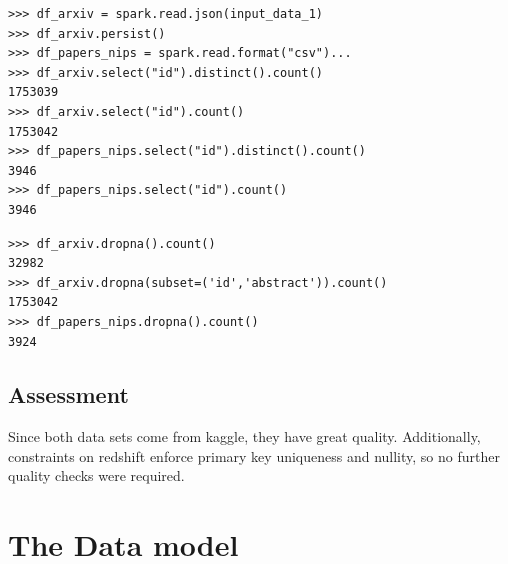 \begin{mdframed}[backgroundcolor=light-gray, roundcorner=10pt,leftmargin=1, rightmargin=1, innerleftmargin=15, innertopmargin=15,innerbottommargin=15, outerlinewidth=1, linecolor=light-gray]
\begin{lstlisting}[caption={Volume and Uniqueness},label={vol}]  
>>> df_arxiv = spark.read.json(input_data_1)
>>> df_arxiv.persist()
>>> df_papers_nips = spark.read.format("csv")...
>>> df_arxiv.select("id").distinct().count()
1753039                                                                         
>>> df_arxiv.select("id").count()
1753042                                                                         
>>> df_papers_nips.select("id").distinct().count()
3946
>>> df_papers_nips.select("id").count()
3946
\end{lstlisting}
\end{mdframed} 

\begin{mdframed}[backgroundcolor=light-gray, roundcorner=10pt,leftmargin=1, rightmargin=1, innerleftmargin=15, innertopmargin=15,innerbottommargin=15, outerlinewidth=1, linecolor=light-gray]
\begin{lstlisting}[caption={Completeness of the Datastsets},label={completeness}]  
>>> df_arxiv.dropna().count()
32982                                                                           
>>> df_arxiv.dropna(subset=('id','abstract')).count()
1753042                                                                         
>>> df_papers_nips.dropna().count()
3924
\end{lstlisting}
\end{mdframed} 

\subsection{Assessment}
Since both data sets come from kaggle, they have great quality. Additionally, constraints on redshift enforce primary key uniqueness and nullity, so
no further quality checks were required.

\section{The Data model}

